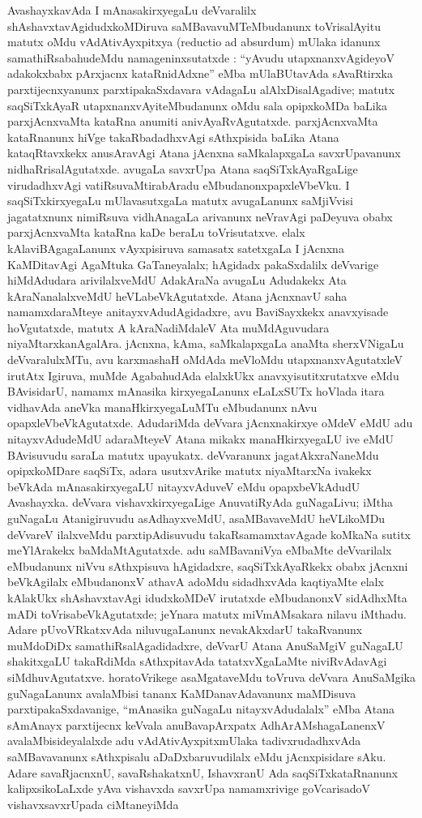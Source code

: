 AvashayxkavAda I mAnasakirxyegaLu deVvaralilx shAshavxtavAgidudxkoMDiruva saMBava\-vuMTeMbudanunx toVrisalAyitu matutx oMdu vAdAtivAyxpitxya {\rm(reductio ad absurdum)} mUlaka idanunx samathiRsabahudeMdu namageninxsutatxde : ``yAvudu utapxnanxvAgideyoV adakokxbabx pArxjacnx kataRnidAdxne'' eMba mUlaBUtavAda sAvaR\-tirxka parxtijecnxyanunx parxtipakaSxdavara vAdagaLu alAlxDisalAgadive; matutx saqSiTxkAyaR utapxnanx\-vAyiteMbudanunx oMdu sala opipxkoMDa baLika parxjAcnxvaMta kataRna anumiti ani\-vAyaRvAgutatxde. parxjAcnxvaMta kataRnanunx hiVge takaRbadadhxvAgi sAthxpisida baLika Atana kataqRtavxkekx anusAravAgi Atana jAcnxna saMkalapxgaLa savxrUpavanunx nidhaRrisalAgutatxde. avu\-gaLa savxrUpa Atana saqSiTxkAyaRgaLige virudadhxvAgi vatiRsuvaMtirabAradu eMbuda\-nonxpapxleVbeVku. I saqSiTxkirxyegaLu mUlavasutxgaLa matutx avugaLanunx saMjiVvisi jaga\-tatxnunx nimiRsuva vidhAnagaLa arivanunx neVravAgi paDeyuva obabx parxjAcnxvaMta kataRna kaDe beraLu toVrisutatxve. elalx kAlaviBAgagaLanunx vAyxpisiruva samasatx satetxgaLa I jAcnxna KaMDitavAgi AgaMtuka GaTaneyalalx; hAgidadx pakaSxdalilx deVvarige hiMdAdudara arivilalxveMdU AdakAraNa avugaLu Adudakekx Ata kAraNanalalxveMdU heVLabeVkAgutatxde. Atana jAcnxnavU saha namamxdaraMteye anitayxvAdudAgidadxre, avu BaviSayxkekx anavxyisade hoVgutatxde, matutx A kAraNadiMdaleV Ata muMdAguvudara niyaMtarxkanAgalAra. jAcnxna, kAma, saMkalapxgaLa anaMta sherxVNigaLu deVvaralulxMTu, avu karxmashaH oMdAda meVloMdu utapxnanxvAgutatxleV irutAtx Igiruva, muMde AgabahudAda elalxkUkx anavxyisutitxrutatxve eMdu BAvisidarU, namamx mAnasika kirxyegaLanunx eLaLxSUTx hoVlada itara vidhavAda aneVka manaHkirxyegaLuMTu eMbudanunx nAvu opapxleVbeVkAgutatxde. AdudariMda deVvara jAcnxnakirxye oMdeV eMdU adu nitayxvAdudeMdU adaraMteyeV Atana mikakx manaHkirxyegaLU ive eMdU BAvisuvudu saraLa matutx upayukatx. deVvaranunx jagatAkxraNaneMdu opipxkoMDare saqSiTx, adara usutxvArike matutx niyaM\-tarxNa ivakekx beVkAda mAnasakirxyegaLU nitayxvAduveV eMdu opapxbeVkAdudU Avashayxka. deVvara vishavxkirxyegaLige AnuvatiRyAda guNagaLivu; iMtha guNagaLu Atanigiruvudu asAdhayxveMdU, asaMBavaveMdU heVLikoMDu deVvareV ilalxveMdu parxtipAdisuvudu takaRsamamxtavAgade koMkaNa sutitx meYlArakekx baMdaMtAgutatxde. adu saMBavaniVya eMbaMte deVvarilalx eMbudanunx niVvu sAthxpisuva hAgidadxre, saqSiTxkAyaRkekx obabx jAcnxni beVkAgilalx eMbudanonxV athavA adoMdu sidadhxvAda kaqtiyaMte elalx kAlakUkx shAshavxtavAgi idudxkoMDeV irutatxde eMbudanonxV sidAdhxMta mADi toVrisabeVkAgu\-tatxde; jeYnara matutx miVmAMsakara nilavu iMthadu. Adare pUvoVRkatxvAda niluvu\-gaLanunx nevakAkxdarU takaRvanunx muMdoDiDx samathiRsalAgadidadxre, deVvarU Atana AnuSaMgiV guNagaLU shakitxgaLU takaRdiMda sAthxpitavAda tatatxvXgaLaMte niviRvAdavAgi siMdhuvAgutatxve. horatoVrikege asaMgataveMdu toVruva deVvara AnuSaMgika guNagaLanunx avalaMbisi tananx KaMDanavAdavanunx maMDisuva parxtipakaSxdavanige, ``mAnasika guNagaLu nitayxvAdudalalx'' eMba Atana sAmAnayx parxtijecnx keVvala anuBavapArxpatx AdhArAMshagaLanenxV avalaMbisideyalalxde adu vAdAtivAyxpitxmUlaka tadivxrudadhxvAda saMBavavanunx sAthxpisalu aDaDxbaruvudilalx eMdu jAcnxpisidare sAku. Adare savaRjacnxnU, savaRshakatxnU, IshavxranU Ada saqSiTxkataRnanunx kalipxsikoLaLxde yAva vishavxda savxrUpa namamxrivige goVcarisadoV vishavxsavxrUpada ciMtaneyiMda 